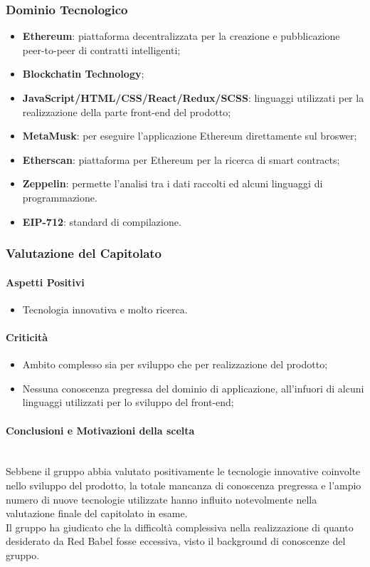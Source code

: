 \subsubsection{Dominio Tecnologico}

\begin{itemize}
  \item \textbf{Ethereum}: piattaforma decentralizzata per la creazione e pubblicazione peer-to-peer di contratti intelligenti;
  \item \textbf{Blockchatin Technology};
  \item \textbf{JavaScript/HTML/CSS/React/Redux/SCSS}: linguaggi utilizzati per la realizzazione della parte front-end del prodotto;
  \item \textbf{MetaMusk}: per eseguire l'applicazione Ethereum direttamente sul broswer;
  \item \textbf{Etherscan}: piattaforma per Ethereum per la ricerca di smart contracts;
  \item \textbf{Zeppelin}: permette l'analisi tra i dati raccolti ed alcuni linguaggi di programmazione.
  \item \textbf{EIP-712}: standard di compilazione.
\end{itemize}

\subsubsection{Valutazione del Capitolato}
\paragraph{Aspetti Positivi}
\begin{itemize}
  \item Tecnologia innovativa e molto ricerca.
\end{itemize}

\paragraph{Criticità}
\begin{itemize}
  \item Ambito complesso sia per sviluppo che per realizzazione del prodotto;
  \item Nessuna conoscenza pregressa del dominio di applicazione, all'infuori di alcuni linguaggi utilizzati per lo sviluppo del front-end;
\end{itemize}
\paragraph{Conclusioni e Motivazioni della scelta} ~\\
Sebbene il gruppo abbia valutato positivamente le tecnologie innovative coinvolte nello sviluppo del prodotto, la totale mancanza di conoscenza pregressa e l'ampio numero di nuove tecnologie utilizzate hanno influito notevolmente nella valutazione finale del capitolato in esame. \\
Il gruppo ha giudicato che la difficoltà complessiva nella realizzazione di quanto desiderato da Red Babel fosse eccessiva, visto il background di conoscenze del gruppo.

